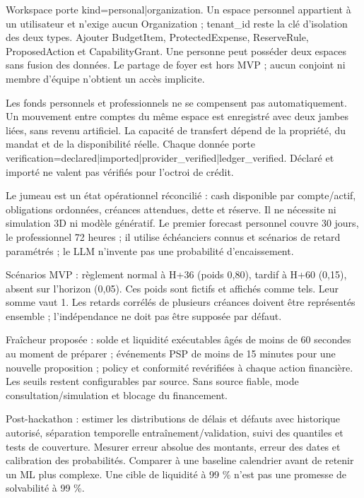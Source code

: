 \documentclass[10pt,a4paper]{article}
\makeatletter
\renewcommand\section{\@startsection{section}{1}{0pt}{16pt plus 2pt minus 1pt}{8pt}{\displayfont\fontsize{16}{20}\selectfont\color{forest}}}
\makeatother
\begin{document}
Workspace porte kind=personal|organization. Un espace personnel appartient à un utilisateur et n'exige aucun Organization ; tenant\_\allowbreak id reste la clé d'isolation des deux types. Ajouter BudgetItem, ProtectedExpense, ReserveRule, ProposedAction et CapabilityGrant. Une personne peut posséder deux espaces sans fusion des données. Le partage de foyer est hors MVP ; aucun conjoint ni membre d'équipe n'obtient un accès implicite.\par

Les fonds personnels et professionnels ne se compensent pas automatiquement. Un mouvement entre comptes du même espace est enregistré avec deux jambes liées, sans revenu artificiel. La capacité de transfert dépend de la propriété, du mandat et de la disponibilité réelle. Chaque donnée porte verification=declared|imported|provider\_\allowbreak verified|ledger\_\allowbreak verified. Déclaré et importé ne valent pas vérifiés pour l'octroi de crédit.\par

\section{Prévisions et jumeau de trésorerie}\label{ch:12}
Le jumeau est un état opérationnel réconcilié : cash disponible par compte/actif, obligations ordonnées, créances attendues, dette et réserve. Il ne nécessite ni simulation 3D ni modèle génératif. Le premier forecast personnel couvre 30 jours, le professionnel 72 heures ; il utilise échéanciers connus et scénarios de retard paramétrés ; le LLM n'invente pas une probabilité d'encaissement.\par

Scénarios MVP : règlement normal à H+36 (poids 0,80), tardif à H+60 (0,15), absent sur l'horizon (0,05). Ces poids sont fictifs et affichés comme tels. Leur somme vaut 1. Les retards corrélés de plusieurs créances doivent être représentés ensemble ; l'indépendance ne doit pas être supposée par défaut.\par

Fraîcheur proposée : solde et liquidité exécutables âgés de moins de 60 secondes au moment de préparer ; événements PSP de moins de 15 minutes pour une nouvelle proposition ; policy et conformité revérifiées à chaque action financière. Les seuils restent configurables par source. Sans source fiable, mode consultation/simulation et blocage du financement.\par

Post-hackathon : estimer les distributions de délais et défauts avec historique autorisé, séparation temporelle entraînement/validation, suivi des quantiles et tests de couverture. Mesurer erreur absolue des montants, erreur des dates et calibration des probabilités. Comparer à une baseline calendrier avant de retenir un ML plus complexe. Une cible de liquidité à 99 \% n'est pas une promesse de solvabilité à 99 \%.\par
\end{document}
